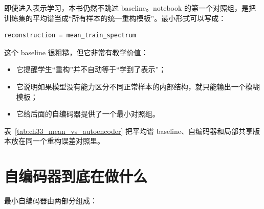 即使进入表示学习，本书仍然不跳过 baseline。notebook 的第一个对照组，是把训练集的平均谱当成“所有样本的统一重构模板”。最小形式可以写成：

\begin{examplebox}
\begin{lstlisting}[style=pythonstyle]
reconstruction = mean_train_spectrum
\end{lstlisting}
\end{examplebox}

这个 baseline 很粗糙，但它非常有教学价值：

\begin{itemize}
    \item 它提醒学生“重构”并不自动等于“学到了表示”；
    \item 它说明如果模型没有能力区分不同正常样本的内部结构，就只能输出一个模糊模板；
    \item 它给后面的自编码器提供了一个最小对照组。
\end{itemize}

表~\ref{tab:ch33_mean_vs_autoencoder} 把平均谱 baseline、自编码器和局部共享版本放在同一个重构误差对照里。

\begin{table}[htbp]
\centering
\small
{}
\caption{本章教学 notebook 中几种最小重构方案的对照。重点不是追求最低数字，而是观察模型是否真的学会了正常数据中的可复用结构。}
\label{tab:ch33_mean_vs_autoencoder}
\end{table}

\section{自编码器到底在做什么}

最小自编码器由两部分组成：


